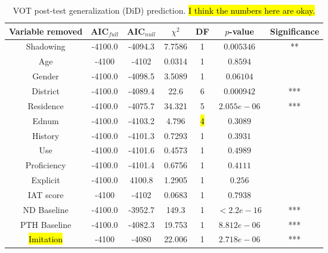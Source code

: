 \begin{table}
\centering
 \begin{tabular}{|c||c|c|c|c|c|c|} 
 \hline
 \textbf{Variable removed} & \textbf{AIC$_{full}$} & \textbf{AIC$_{null}$} & $\chi^2$ & \textbf{DF} & \textbf{$p$-value} & \textbf{Significance}\\ [0.5ex] 
 \hline
  Shadowing & -4100.0 & -4094.3 & 7.7586 & 1 & $0.005346$ & **\\ 
 \hline
 Age & -4100 & -4102 & 0.0314 & 1 & $0.8594$ & \\
 \hline
 Gender & -4100.0 & -4098.5 & 3.5089 & 1 & $0.06104$ & \\
 \hline
 District & -4100.0 & -4089.4 & 22.6 & 6 & $0.000942$ & ***\\
 \hline
 Residence & -4100.0 & -4075.7 & 34.321 & 5 & $2.055e-06$ & ***\\
 \hline
 Ednum & -4100.0 & -4103.2 & 4.796 & \hl{4} & $0.3089$ & \\
 \hline
 History & -4100.0 & -4101.3 & 0.7293 & 1 & $0.3931$ & \\
 \hline
 Use & -4100.0 & -4101.6 & 0.4573 & 1 & $0.4989$ & \\
 \hline
 Proficiency & -4100.0 & -4101.4 & 0.6756 & 1 & $0.4111$ & \\
 \hline
 Explicit & -4100.0 & 4100.8 & 1.2905 & 1 & $0.256$ & \\
 \hline
 IAT score & -4100 & -4102 & 0.0683 & 1 & $0.7938$ & \\
 \hline
 ND Baseline & -4100.0 & -3952.7 & 149.3 & 1 & $< 2.2e-16$ & ***\\
 \hline
 PTH Baseline & -4100.0 & -4082.3 & 19.753 & 1 & $8.812e-06$ & ***\\
 \hline
 \hl{Imitation} & -4100 & -4080 & 22.006 & 1 & $2.718e-06$ & ***\\%
 \hline
\end{tabular}
\caption{VOT post-test generalization (DiD) prediction. \hl{I think the numbers here are okay.}}
\label{tab:VOTshadPredictors}
\end{table}

